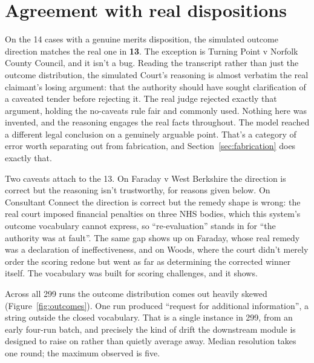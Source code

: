 \section{Agreement with real dispositions}
\label{sec:agreement}

On the 14 cases with a genuine merits disposition, the simulated outcome
direction matches the real one in \textbf{13}. The exception is Turning Point v
Norfolk County Council, and it isn't a bug. Reading the transcript rather than
just the outcome distribution, the simulated Court's reasoning is almost verbatim
the real claimant's losing argument: that the authority should have sought
clarification of a caveated tender before rejecting it. The real judge rejected
exactly that argument, holding the no-caveats rule fair and commonly used.
Nothing here was invented, and the reasoning engages the real facts throughout.
The model reached a different legal conclusion on a genuinely arguable
point. That's a category of error worth separating out from fabrication, and
Section~\ref{sec:fabrication} does exactly that.

Two caveats attach to the 13. On Faraday v West Berkshire the direction is
correct but the reasoning isn't trustworthy, for reasons given below. On
Consultant Connect the direction is correct but the remedy shape is wrong: the
real court imposed financial penalties on three NHS bodies, which this system's
outcome vocabulary cannot express, so ``re-evaluation'' stands in for ``the
authority was at fault''.
The same gap shows up on Faraday, whose real remedy was a declaration of
ineffectiveness, and on Woods, where the court didn't merely order the scoring
redone but went as far as determining the corrected winner itself. The
vocabulary was built for scoring challenges, and it shows.

Across all 299 runs the outcome distribution comes out heavily skewed
(Figure~\ref{fig:outcomes}). One run produced ``request for additional
information'', a string outside the closed vocabulary. That is a single
instance in 299, from an early four-run batch, and precisely the kind of drift the
downstream module is designed to raise on rather than quietly average away. Median
resolution takes one round; the maximum observed is five.

